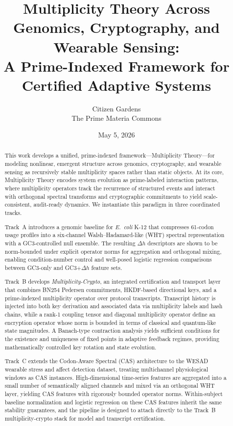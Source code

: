 \documentclass[11pt]{article}
\begin{document}
\title{Multiplicity Theory Across Genomics, Cryptography, and Wearable Sensing:\\
A Prime-Indexed Framework for Certified Adaptive Systems}

\author{Citizen Gardens \\ The Prime Materia Commons}

\date{May 5, 2026}
\maketitle
\begin{abstract}
This work develops a unified, prime-indexed framework---Multiplicity Theory---for modeling nonlinear, emergent structure across genomics, cryptography, and wearable sensing as recursively stable multiplicity spaces rather than static objects. At its core, Multiplicity Theory encodes system evolution as prime-labeled interaction patterns, where multiplicity operators track the recurrence of structured events and interact with orthogonal spectral transforms and cryptographic commitments to yield scale-consistent, audit-ready dynamics. We instantiate this paradigm in three coordinated tracks.

Track~A introduces a genomic baseline for \emph{E.\ coli} K-12 that compresses 61-codon usage profiles into a six-channel Walsh--Hadamard-like (WHT) spectral representation with a GC3-controlled null ensemble. The resulting \(\Delta h\) descriptors are shown to be norm-bounded under explicit operator norms for aggregation and orthogonal mixing, enabling condition-number control and well-posed logistic regression comparisons between GC3-only and GC3+\(\Delta h\) feature sets.

Track~B develops \emph{Multiplicity-Crypto}, an integrated certification and transport layer that combines BN254 Pedersen commitments, HKDF-based directional keys, and a prime-indexed multiplicity operator over protocol transcripts. Transcript history is injected into both key derivation and associated data via multiplicity labels and hash chains, while a rank-1 coupling tensor and diagonal multiplicity operator define an encryption operator whose norm is bounded in terms of classical and quantum-like state magnitudes. A Banach-type contraction analysis yields sufficient conditions for the existence and uniqueness of fixed points in adaptive feedback regimes, providing mathematically controlled key rotation and state evolution.

Track~C extends the Codon-Aware Spectral (CAS) architecture to the WESAD wearable stress and affect detection dataset, treating multichannel physiological windows as CAS instances. High-dimensional time-series features are aggregated into a small number of semantically aligned channels and mixed via an orthogonal WHT layer, yielding CAS features with rigorously bounded operator norms. Within-subject baseline normalization and logistic regression on these CAS features inherit the same stability guarantees, and the pipeline is designed to attach directly to the Track~B multiplicity-crypto stack for model and transcript certification.


\end{abstract}
\end{document}
